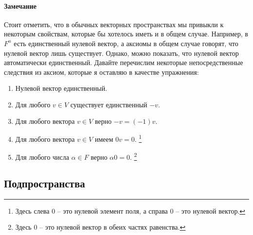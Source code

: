 \paragraph{Замечание}

Стоит отметить, что в обычных векторных пространствах мы привыкли к некоторым свойствам, которые бы хотелось иметь и в общем случае.
Например, в $F^n$ есть единственный нулевой вектор, а аксиомы в общем случае говорят, что нулевой вектор лишь существует.
Однако, можно показать, что нулевой вектор автоматически единственный.
Давайте перечислим некоторые непосредственные следствия из аксиом, которые я оставляю в качестве упражнения:
\begin{enumerate}
\item Нулевой вектор единственный.

\item Для любого $v\in V$ существует единственный $-v$.

\item Для любого вектора $v\in V$ верно $-v = (-1)v$.

\item Для любого вектора $v\in V$ имеем $0 v = 0$.%
\footnote{Здесь слева $0$ -- это нулевой элемент поля, а справа $0$ -- это нулевой вектор.}

\item Для любого числа $\alpha \in F$ верно $\alpha 0 = 0$.%
\footnote{Здесь $0$ -- это нулевой вектор в обеих частях равенства.}
\end{enumerate}

\subsection{Подпространства}

